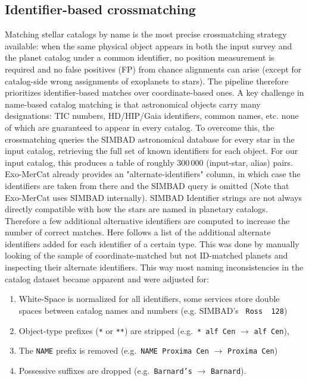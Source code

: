 \subsection{Identifier-based crossmatching}
\label{sec:id_matching}
Matching stellar catalogs by name is the most precise crossmatching strategy available: when the same physical object appears in both the input survey and the planet catalog under a common identifier, no position measurement is required and no false positives (FP) from chance alignments can arise (except for catalog-side wrong assignments of exoplanets to stars).
The pipeline therefore prioritizes identifier-based matches over coordinate-based ones.
A key challenge in name-based catalog matching is that astronomical objects carry many designations: TIC numbers, HD/HIP/Gaia identifiers, common names, etc. none of which are guaranteed to appear in every catalog. To overcome this, the crossmatching queries the SIMBAD astronomical database \cite{Simbad} for every star in the input catalog, retrieving the full set of known identifiers for each object.
For our input catalog, this produces a table of roughly 300\,000 (input-star, alias) pairs. Exo-MerCat already provides an "alternate-identifiers" column, in which case the identifiers are taken from there and the SIMBAD query is omitted (Note that Exo-MerCat uses SIMBAD internally). 
SIMBAD Identifier strings are not always directly compatible with how the stars are named in planetary catalogs. Therefore a few additional alternative identifiers are computed to increase the number of correct matches. Here follows a list of the additional alternate identifiers added for each identifier of a certain type. This was done by manually looking of the sample of coordinate-matched but not ID-matched planets and inspecting their alternate identifiers. This way most naming inconsistencies in the catalog dataset became apparent and were adjusted for:
\begin{enumerate}
    \item White-Space is normalized for all identifiers, some services store double spaces between catalog names and numbers (e.g. SIMBAD's \ \texttt{Ross~~128})
    \item Object-type prefixes (\texttt{*} or \texttt{**}) are stripped (e.g.\ \texttt{* alf~Cen} $\to$ \texttt{alf~Cen}), 
    \item The \texttt{NAME} prefix is removed (e.g.\ \texttt{NAME Proxima~Cen} $\to$ \texttt{Proxima~Cen})
    \item Possessive suffixes are dropped (e.g.\ \texttt{Barnard's} $\to$ \texttt{Barnard}).
\end{enumerate}
